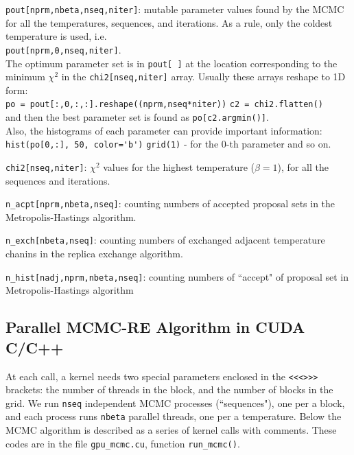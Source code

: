 \documentclass[preprint2]{aastex}
\begin{document}
\verb|pout[nprm,nbeta,nseq,niter]|: mutable parameter values found by the MCMC for
                             all the temperatures, sequences, and iterations.
                             As a rule, only the coldest temperature is used,
                             i.e. \\
                             \verb|pout[nprm,0,nseq,niter]|. \\
                             The optimum parameter set is in \verb|pout[ ]| at the
                             location corresponding to the minimum $\chi^2$
                             in the \verb|chi2[nseq,niter]| array. Usually these
                             arrays reshape to 1D form:\\ 
                             \verb|po = pout[:,0,:,:].reshape((nprm,nseq*niter))|
                             \verb|c2 = chi2.flatten()| \\
                             and then the best parameter set is found as
                             \verb|po[c2.argmin()]|. \\
                             Also, the histograms of each
                             parameter can provide important information: \\
                             \verb|hist(po[0,:], 50, color='b')|
                             \verb|grid(1)| - for the 0-th parameter and so on.

\verb|chi2[nseq,niter]|: $\chi^2$ values for the highest temperature ($\beta=1$), 
                         for all the sequences and iterations.

\verb|n_acpt[nprm,nbeta,nseq]|: counting numbers of accepted proposal sets in the
                         Metropolis-Hastings algorithm.

\verb|n_exch[nbeta,nseq]|: counting numbers of exchanged adjacent temperature
                    chanins in the replica exchange algorithm.

\verb|n_hist[nadj,nprm,nbeta,nseq]|: counting numbers of ``accept" of proposal set
                              in Metropolis-Hastings algorithm




\subsection{Parallel MCMC-RE Algorithm in CUDA C/C++}

At each call, a kernel needs two special parameters enclosed in the \verb|<<<>>>| brackets:
the number of threads in the block, and the number of blocks in the grid. We run \verb|nseq|
independent MCMC processes (``sequences"), one per a block, and each process runs \verb|nbeta|
parallel threads, one per a temperature. Below the MCMC algorithm is described as a series of
kernel calls with comments. These codes are in the file \verb|gpu_mcmc.cu|, function \verb|run_mcmc()|. \\
\end{document}
